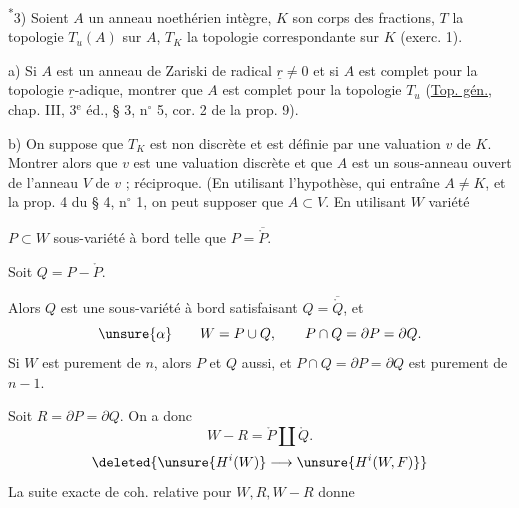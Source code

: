 \textsuperscript{*}3) Soient $A$ un anneau noethérien intègre, $K$ son corps des fractions, $T$ la topologie $T_u(A)$ sur $A$, $T_K$ la topologie correspondante sur $K$ (exerc. 1).

a) Si $A$ est un anneau de Zariski de radical $\underline r\ne0$ et si $A$ est complet pour la topologie $\underline r$-adique, montrer que $A$ est complet pour la topologie $T_u$ (\uline{Top. gén.}, chap. III, 3$^{\mathrm e}$ éd., § 3, n$^\circ$ 5, cor. 2 de la prop. 9).

b) On suppose que $T_K$ est non discrète et est définie par une valuation $v$ de $K$. Montrer alors que $v$ est une valuation discrète et que $A$ est un sous-anneau ouvert de l'anneau $V$ de $v$ ; réciproque. (En utilisant l'hypothèse, qui entraîne $A\ne K$, et la prop. 4 du § 4, n$^\circ$ 1, on peut supposer que $A\subset V$. En utilisant
$W$ variété 

$P\subset W$ sous-variété à bord telle que $P=\overline{\mathring P}$.

Soit $Q=P-\mathring P$.

Alors $Q$ est une sous-variété à bord satisfaisant $Q=\overline{\mathring Q}$, et
\[
\unsure{\alpha}\qquad W=P\cup Q,\qquad P\cap Q=\partial P=\partial Q.
\]
Si $W$ est purement de  $n$, alors $P$ et $Q$ aussi, et $P\cap Q=\partial P=\partial Q$ est purement de  $n-1$.

Soit $R=\partial P=\partial Q$. On  a donc
\[
W-R=\mathring P\amalg\mathring Q.
\]
\[
\deleted{\unsure{H^i(W)}\longrightarrow\unsure{H^i(W,F)}}
\]
La suite exacte de coh. relative pour $W,R,W-R$ donne

